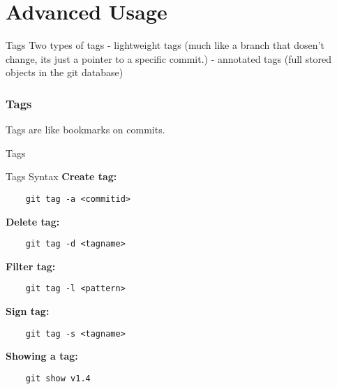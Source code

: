 \section{Advanced Usage}


\begin{frame}[fragile]{Tags}
    Two types of tags
    - lightweight tags (much like a branch that dosen't change, its just a pointer to
    a specific commit.)
    - annotated tags (full stored objects in the git database)
\end{frame}

\begin{frame}
    \frametitle{Tags}
    Tags are like bookmarks on commits.
    \begin{figure}[b]
        \centering
    \end{figure}
\end{frame}

\begin{frame}[fragile]{Tags}
    \mytag
    \begin{figure}[b]
        \centering
    \end{figure}
\end{frame}

\begin{frame}[fragile]{Tags Syntax}
    \textbf{Create tag:}
    \begin{lstlisting}
    git tag -a <commitid>
    \end{lstlisting}
    \textbf{Delete tag:}
    \begin{lstlisting}
    git tag -d <tagname>
    \end{lstlisting}
    \textbf{Filter tag:}
    \begin{lstlisting}
    git tag -l <pattern>
    \end{lstlisting}
    \textbf{Sign tag:}
    \begin{lstlisting}
    git tag -s <tagname>
    \end{lstlisting}
    \textbf{Showing a tag:}
    \begin{lstlisting}
    git show v1.4
    \end{lstlisting}
\end{frame}

